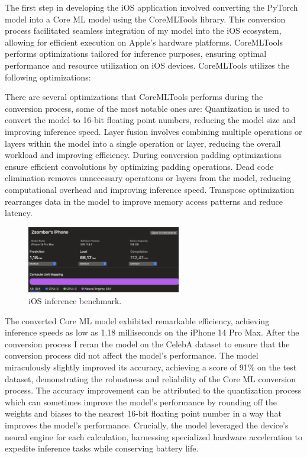 \documentclass[a4paper,oneside]{article}
\begin{document}
The first step in developing the iOS application involved converting the PyTorch model into a Core ML model using the CoreMLTools library.
This conversion process facilitated seamless integration of my model into the iOS ecosystem, allowing for efficient execution on Apple's hardware platforms.
CoreMLTools performs optimizations tailored for inference purposes, ensuring optimal performance and resource utilization on iOS devices.
CoreMLTools utilizes the following optimizations:

There are several optimizations that CoreMLTools performs during the conversion process, some of the most notable ones are:
Quantization is used to convert the model to 16-bit floating point numbers, reducing the model size and improving inference speed.
Layer fusion involves combining multiple operations or layers within the model into a single operation or layer, reducing the overall workload and improving efficiency.
During conversion padding optimizations ensure efficient convolutions by optimizing padding operations.
Dead code elimination removes unnecessary operations or layers from the model, reducing computational overhead and improving inference speed.
Transpose optimization rearranges data in the model to improve memory access patterns and reduce latency.

\begin{figure}[h]
  \includegraphics[width=0.6\textwidth]{iOSInference.png}
  \centering
  \caption{iOS inference benchmark.}
  \centering
\end{figure}

The converted Core ML model exhibited remarkable efficiency, achieving inference speeds as low as 1.18 milliseconds on the iPhone 14 Pro Max.
After the conversion process I reran the model on the CelebA dataset to ensure that the conversion process did not affect the model's performance.
The model miraculously slightly improved its accuracy, achieving a score of 91\% on the test dataset, demonstrating the robustness and reliability of the Core ML conversion process.
The accuracy improvement can be attributed to the quantization process which can sometimes improve the model's performance by rounding off the weights and biases to the nearest 16-bit floating point number in a way that improves the model's performance.
Crucially, the model leveraged the device's neural engine for each calculation, harnessing specialized hardware acceleration to expedite inference tasks while conserving battery life.
\end{document}
